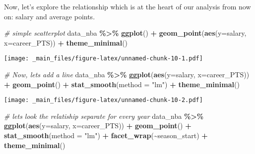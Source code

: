 \documentclass[
]{book}
\newenvironment{Shaded}{\begin{snugshade}}{\end{snugshade}}
\newcommand{\AttributeTok}[1]{\textcolor[rgb]{0.13,0.29,0.53}{#1}}
\newcommand{\CommentTok}[1]{\textcolor[rgb]{0.56,0.35,0.01}{\textit{#1}}}
\newcommand{\FunctionTok}[1]{\textcolor[rgb]{0.13,0.29,0.53}{\textbf{#1}}}
\newcommand{\NormalTok}[1]{#1}
\newcommand{\SpecialCharTok}[1]{\textcolor[rgb]{0.81,0.36,0.00}{\textbf{#1}}}
\newcommand{\StringTok}[1]{\textcolor[rgb]{0.31,0.60,0.02}{#1}}
\begin{document}
Now, let's explore the relationship which is at the heart of our analysis from now on: salary and average points.

\begin{Shaded}
\begin{Highlighting}[]
\CommentTok{\# simple scatterplot}
\NormalTok{data\_nba }\SpecialCharTok{\%\textgreater{}\%} \FunctionTok{ggplot}\NormalTok{() }\SpecialCharTok{+}
\FunctionTok{geom\_point}\NormalTok{(}\FunctionTok{aes}\NormalTok{(}\AttributeTok{y=}\NormalTok{salary, }\AttributeTok{x=}\NormalTok{career\_PTS)) }\SpecialCharTok{+} 
  \FunctionTok{theme\_minimal}\NormalTok{()}
\end{Highlighting}
\end{Shaded}

\texttt{[image: \_main\_files/figure-latex/unnamed-chunk-10-1.pdf]}

\begin{Shaded}
\begin{Highlighting}[]
\CommentTok{\# Now, let\textquotesingle{}s add a line}
\NormalTok{data\_nba }\SpecialCharTok{\%\textgreater{}\%} 
  \FunctionTok{ggplot}\NormalTok{(}\FunctionTok{aes}\NormalTok{(}\AttributeTok{y=}\NormalTok{salary, }\AttributeTok{x=}\NormalTok{career\_PTS)) }\SpecialCharTok{+}
    \FunctionTok{geom\_point}\NormalTok{() }\SpecialCharTok{+} 
     \FunctionTok{stat\_smooth}\NormalTok{(}\AttributeTok{method =} \StringTok{"lm"}\NormalTok{) }\SpecialCharTok{+} 
       \FunctionTok{theme\_minimal}\NormalTok{()}
\end{Highlighting}
\end{Shaded}

\texttt{[image: \_main\_files/figure-latex/unnamed-chunk-10-2.pdf]}

\begin{Shaded}
\begin{Highlighting}[]
\CommentTok{\# let\textquotesingle{}s look the relatiship separate for every year}
\NormalTok{data\_nba }\SpecialCharTok{\%\textgreater{}\%} 
  \FunctionTok{ggplot}\NormalTok{(}\FunctionTok{aes}\NormalTok{(}\AttributeTok{y=}\NormalTok{salary, }\AttributeTok{x=}\NormalTok{career\_PTS)) }\SpecialCharTok{+}
    \FunctionTok{geom\_point}\NormalTok{() }\SpecialCharTok{+} 
     \FunctionTok{stat\_smooth}\NormalTok{(}\AttributeTok{method =} \StringTok{"lm"}\NormalTok{) }\SpecialCharTok{+} 
        \FunctionTok{facet\_wrap}\NormalTok{(}\SpecialCharTok{\textasciitilde{}}\NormalTok{season\_start) }\SpecialCharTok{+} 
       \FunctionTok{theme\_minimal}\NormalTok{()}
\end{Highlighting}
\end{Shaded}
\end{document}
